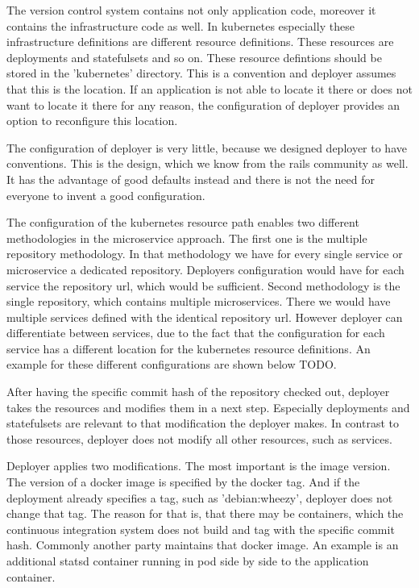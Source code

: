 The version control system contains not only application code, moreover it contains the
infrastructure code as well. In kubernetes especially these infrastructure definitions are
different resource definitions. These resources are deployments and statefulsets and so
on. These resource defintions should be stored in the 'kubernetes' directory. This is a
convention and deployer assumes that this is the location. If an application is not able
to locate it there or does not want to locate it there for any reason, the configuration
of deployer provides an option to reconfigure this location.

The configuration of deployer is very little, because we designed deployer to have
conventions. This is the design, which we know from the rails community as well. It has
the advantage of good defaults instead and there is not the need for everyone to invent a
good configuration.

The configuration of the kubernetes resource path enables two different methodologies in
the microservice approach. The first one is the multiple repository methodology. In that
methodology we have for every single service or microservice a dedicated repository.
Deployers configuration would have for each service the repository url, which would be
sufficient. Second methodology is the single repository, which contains multiple
microservices. There we would have multiple services defined with the identical repository
url. However deployer can differentiate between services, due to the fact that the
configuration for each service has a different location for the kubernetes resource
definitions. An example for these different configurations are shown below TODO.

After having the specific commit hash of the repository checked out, deployer takes the
resources and modifies them in a next step. Especially deployments and statefulsets are
relevant to that modification the deployer makes. In contrast to those resources, deployer
does not modify all other resources, such as services.

Deployer applies two modifications. The most important is the image version. The version
of a docker image is specified by the docker tag. And if the deployment already specifies
a tag, such as 'debian:wheezy', deployer does not change that tag. The reason for that is,
that there may be containers, which the continuous integration system does not build and
tag with the specific commit hash. Commonly another party maintains that docker image. An
example is an additional statsd container running in pod side by side to the application
container.


